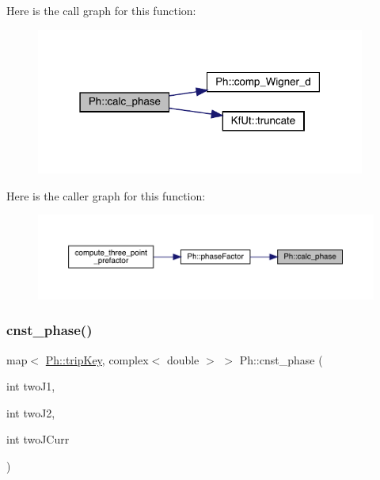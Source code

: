 Here is the call graph for this function\+:\nopagebreak
\begin{figure}[H]
\begin{center}
\leavevmode
\includegraphics[width=307pt]{d6/d3c/namespacePh_a8662b8eefea46c114386b136878a461c_cgraph}
\end{center}
\end{figure}
Here is the caller graph for this function\+:\nopagebreak
\begin{figure}[H]
\begin{center}
\leavevmode
\includegraphics[width=350pt]{d6/d3c/namespacePh_a8662b8eefea46c114386b136878a461c_icgraph}
\end{center}
\end{figure}
\mbox{\label{namespacePh_ac0bb2f4b2888c7c304cb6fcb1b5a7ce2}} 
\subsubsection{\texorpdfstring{cnst\_phase()}{cnst\_phase()}}
{\footnotesize\ttfamily map$<$ \mbox{\hyperlink{namespacePh_afdd5bf3d7b37625115089ea3048e0cbb}{Ph\+::trip\+Key}}, complex$<$ double $>$ $>$ Ph\+::cnst\+\_\+phase (\begin{DoxyParamCaption}\item[{int}]{two\+J1,  }\item[{int}]{two\+J2,  }\item[{int}]{two\+J\+Curr }\end{DoxyParamCaption})}

